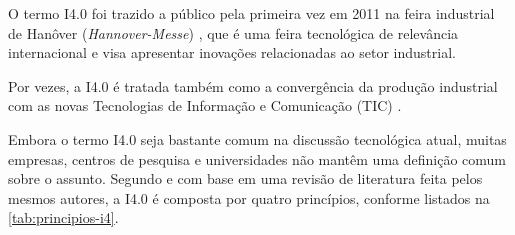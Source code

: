 O termo I4.0 foi trazido a público pela primeira vez em 2011 na feira industrial de Hanôver (\textit{Hannover-Messe}) \cite{kagermann2011industrie}, que é uma feira tecnológica de relevância internacional e visa apresentar inovações relacionadas ao setor industrial.

Por vezes, a I4.0 é tratada também como a convergência da produção industrial com as novas Tecnologias de Informação e Comunicação (TIC) \cite{hermann2016design}.

Embora o termo I4.0 seja bastante comum na discussão tecnológica atual, muitas empresas, centros de pesquisa e universidades não mantêm uma definição comum sobre o assunto. Segundo  e com base em uma revisão de literatura feita pelos mesmos autores, a I4.0 é composta por quatro princípios, conforme listados na \autoref{tab:principios-i4}.

